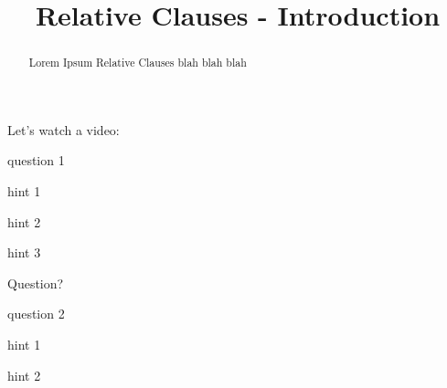 \documentclass{ximera}
\title{Relative Clauses - Introduction}
\begin{document}
\begin{abstract}
Lorem Ipsum Relative Clauses blah blah blah
\end{abstract}
\maketitle

\begin{question}
Let's watch a video:


question 1
\begin{solution}
\begin{hint}
hint 1
\end{hint}
\begin{hint}
hint 2
\end{hint}
\begin{hint}
hint 3
\end{hint}
Question?
\end{solution}
\end{question}

\begin{question}
question 2
\begin{solution}
\begin{multiple-choice}
\end{multiple-choice}
\begin{hint}
hint 1
\end{hint}
\begin{hint}
hint 2
\end{hint}
\end{solution}
\end{question}
\end{document}
